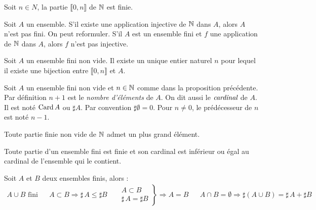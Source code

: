 \begin{propn}\label{pN: 0nFini}
 Soit $n\in N$, la partie $\llbracket 0, n\rrbracket$ de $\mathbb{N}$ est finie.
\end{propn}

\begin{propn}\label{pN: ConPasFin}
 Soit $A$ un ensemble. S'il existe une application injective de $\mathbb{N}$ dans $A$, alors $A$ n'est pas fini. On peut reformuler. S'il $A$ est un ensemble fini et $f$ une application de $\mathbb{N}$ dans $A$, alors $f$ n'est pas injective.
\end{propn}

\begin{propn}\label{pN: DefCard}
 Soit $A$ un ensemble fini non vide. Il existe un unique entier naturel $n$ pour lequel il existe une bijection entre $\llbracket 0, n\rrbracket$ et $A$.
\end{propn}

\begin{defi}
 Soit $A$ un ensemble fini non vide et $n\in \mathbb{N}$ comme dans la proposition précédente. Par définition $n+1$ est le \emph{nombre d'éléments} de $A$. On dit aussi le $\emph{cardinal}$ de $A$. Il est noté $\mathop{\mathrm{Card}} A$ ou $\sharp A$. Par convention $\sharp \emptyset = 0$. Pour $n\neq 0$, le prédécesseur de $n$ est noté $n-1$.
\end{defi}

\begin{propn}\label{pN: FiniMax}
Toute partie finie non vide de $\mathbb{N}$ admet un plus grand élément. 
\end{propn}

\begin{propn}\label{pN: InCard}
Toute partie d'un ensemble fini est finie et son cardinal est inférieur ou égal au cardinal de l'ensemble qui le contient. 
\end{propn}

\begin{propn}\label{pN: PropParFin}
Soit $A$ et $B$ deux ensembles finis, alors :
\begin{align*}
A\cup B \text{ fini} & & A\subset B \Rightarrow  \sharp\, A \leq \sharp B  & & 
\left. 
\begin{aligned}
 A\subset B \\
 \sharp\, A = \sharp B
\end{aligned}
\right\rbrace \Rightarrow A = B
& &
A\cap B = \emptyset \Rightarrow
\sharp (A\cup B ) = \sharp\,A + \sharp B
\end{align*}
\end{propn}

